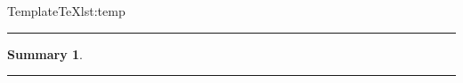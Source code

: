 \begin{code}{Template}{TeX}{lst:temp}



\begin{titlepage}
	\vspace*{1cm}
	\Large
    \textit{\Institute}
    \vspace{0.25cm}

	\Huge
    \textbf{\Title}
    \vspace{0.25cm}

	\Large
	\Author
	\vspace{1.0cm}

	\normalsize
	\rule{\textwidth}{0.4pt}
	\newtheorem*{summary}{Summary}
	\begin{summary}
		\Docsummary
	\end{summary}
	\setcounter{tocdepth}{1}
	\tableofcontents
	\vfill
	\rule{\textwidth}{0.4pt}
\end{titlepage}





\end{code}
